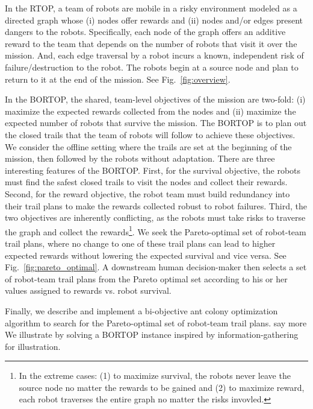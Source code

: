 \documentclass[11pt, oneside]{article}
\begin{document}
In the RTOP, a team of robots are mobile in a risky environment modeled as a directed graph whose (i) nodes offer rewards and (ii) nodes and/or edges present dangers to the robots.
Specifically, each node of the graph offers an additive reward to the team that depends on the number of robots that visit it over the mission. And, each edge traversal by a robot incurs a known, independent risk of failure/destruction to the robot. 
The robots begin at a source node and plan to return to it at the end of the mission. See Fig.~\ref{fig:overview}.

In the BORTOP, the shared, team-level objectives of the mission are two-fold: (i) maximize the expected rewards collected from the nodes and (ii) maximize the expected number of robots that survive the mission. The BORTOP is to plan out the closed trails that the team of robots will follow to achieve these objectives. We consider the offline setting where the trails are set at the beginning of the mission, then followed by the robots without adaptation.
There are three interesting features of the BORTOP. 
First, for the survival objective, the robots must find the safest closed trails to visit the nodes and collect their rewards.
Second, for the reward objective, the robot team must build redundancy into their trail plans to make the rewards collected robust to robot failures.
Third, the two objectives are inherently conflicting, as the robots must take risks to traverse the graph and collect the rewards\footnote{In the extreme cases: (1) to maximize survival, the robots never leave the source node no matter the rewards to be gained and (2) to maximize reward, each robot traverses the entire graph no matter the risks invovled.}.
We seek the Pareto-optimal set of robot-team trail plans, where no change to one of these trail plans can lead to higher expected rewards without lowering the expected survival and vice versa. 
See Fig.~\ref{fig:pareto_optimal}.
A downstream human decision-maker then selects a set of robot-team trail plans from the Pareto optimal set according to his or her values assigned to rewards vs. robot survival. 

Finally, we describe and implement a bi-objective ant colony optimization algorithm to search for the Pareto-optimal set of robot-team trail plans.
{\color{red} say more}
We illustrate by solving a BORTOP instance inspired by information-gathering for illustration.
\end{document}
